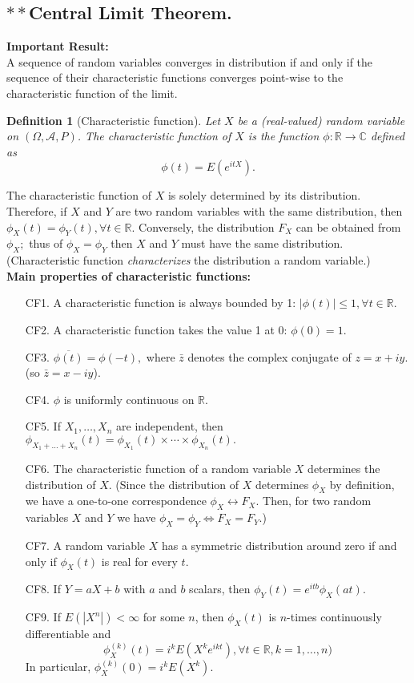\documentclass[12pt]{report} \addtolength{\textheight}{2in}
\newtheorem{defn}{Definition}
\newcommand{\Realnum}{\mathbb{R}}
\newcommand{\bigA}{\mathcal{A}}
\newcommand{\probsp}{(\Omega, \bigA, P)}
\begin{document}
\subsection*{$\ast\ast$Central Limit Theorem.}
\textbf{Important Result:} \\
A sequence of random variables converges in distribution if and only if the sequence of their characteristic functions converges point-wise to the characteristic function of the limit.
\begin{defn}[Characteristic function] Let $X$ be a (real-valued) random variable on $\probsp$. The characteristic function of $X$ is the function $\phi: \Realnum \to \mathbb{C}$ defined as 
\begin{displaymath}\phi(t)=E(e^{itX}).
\end{displaymath}
\end{defn}
The characteristic function of $X$ is solely determined by its distribution. Therefore, if $X$ and $Y$ are two random variables with the same distribution, then $\phi_X(t)=\phi_Y(t), \forall t\in \Realnum.$ Conversely, the distribution $F_X$ can be obtained from $\phi_X;$ thus of $\phi_X=\phi_Y$ then $X$ and $Y$ must have the same distribution. (Characteristic function \textit{characterizes} the distribution a random variable.)\\
\vspace{1in}
\textbf{Main properties of characteristic functions:}
\begin{enumerate}
\item[CF1.] A characteristic function is always bounded by 1: $|\phi(t)| \leq 1, \forall t \in \Realnum.$
\item[CF2.] A characteristic function takes the value 1 at 0: $\phi(0)=1.$
\item[CF3.] $\overline{\phi(t)}=\phi(-t),$ where $\bar{z}$ denotes the complex conjugate of $z=x+iy.$ (so $\bar{z}=x-iy$).
\item[CF4.] $\phi$ is uniformly continuous on $\Realnum.$
\item[CF5.] If $X_1,\dots,X_n$ are independent, then $\phi_{X_1+\dots+X_n}(t)=\phi_{X_{1}}(t)\times \cdots \times \phi_{X_n}(t).$
\item[CF6.] The characteristic function of a random variable $X$ determines the distribution of $X.$ (Since the distribution of $X$ determines $\phi_X$ by definition, we have a one-to-one correspondence $\phi_X \leftrightarrow F_X.$ Then, for two random variables $X$ and $Y$ we have $\phi_X=\phi_Y \Leftrightarrow F_X=F_Y.$) 
\item[CF7.] A random variable $X$ has a symmetric distribution around zero if and only if $\phi_X(t)$ is real for every $t$.
\item[CF8.] If $Y=aX+b$ with $a$ and $b$ scalars, then $\phi_Y(t)=e^{itb}\phi_{X}(at).$
\item[CF9.] If $E(|X^n|) < \infty$ for some $n$, then $\phi_X(t)$ is $n$-times continuously differentiable and 
\begin{displaymath}
\phi_{X}^{(k)}(t)=i^k E(X^k e^{ikt}), \forall t \in \Realnum, k=1,\dots,n)
\end{displaymath}
In particular, $\phi_X^{(k)}(0)=i^kE(X^k).$
\end{enumerate}
\end{document}
